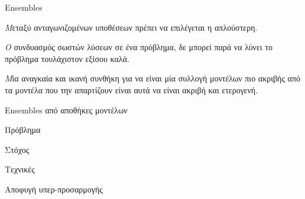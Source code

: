 \documentclass{beamer}
\begin{document}
  \begin{frame}{Ensembles}
  	\begin{flushleft}
  		{\small \textit 
  			Μεταξύ ανταγωνιζομένων υποθέσεων πρέπει να επιλέγεται η απλούστερη.}
  	\end{flushleft}
  	\begin{flushleft}
  		{\small \textit 
  			Ο συνδυασμός σωστών λύσεων σε ένα πρόβλημα, δε μπορεί παρά να λύνει το πρόβλημα τουλάχιστον εξίσου καλά.}
  	\end{flushleft}
  	
  	\begin{flushleft}
  		{\small \textit 
  			Μία αναγκαία και ικανή συνθήκη για να είναι μία συλλογή μοντέλων πιο ακριβής από τα μοντέλα που την απαρτίζουν είναι αυτά να είναι ακριβή και ετερογενή.}
  	\end{flushleft}
  \end{frame}
   \begin{frame}{Ensembles από αποθήκες μοντέλων}
   	\begin{minipage}[t]{.3\textwidth}  		
   		Πρόβλημα
   		\vspace{4ex}
   	\end{minipage}%
   	\begin{minipage}[t]{.6\textwidth}
   		 	
   		\vspace{4ex}
   	\end{minipage}
   	\begin{minipage}[t]{.3\textwidth}  		
   		Στόχος
   		\vspace{4ex}
   	\end{minipage}%
   	\begin{minipage}[t]{.6\textwidth}   		
   		\vspace{4ex} 
   	\end{minipage}
   	\begin{minipage}[t]{.3\textwidth}  		
   		Τεχνικές
   		\vspace{4ex}
   	\end{minipage}%
   	\begin{minipage}[t]{.6\textwidth}
   		Αποφυγή υπερ-προσαρμογής
   		\vspace{4ex}
   	\end{minipage}
   \end{frame}
\end{document}
